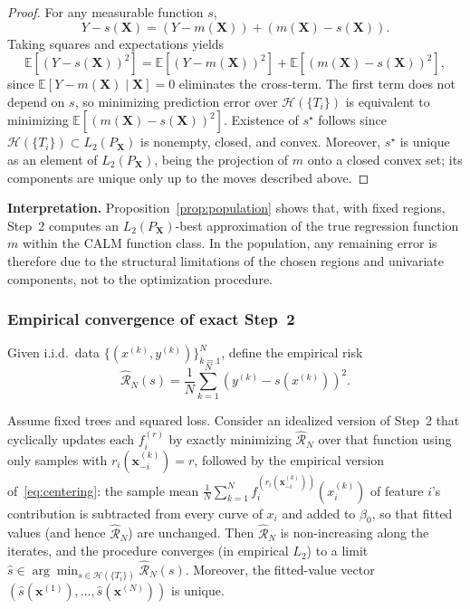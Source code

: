 \begin{proof}
For any measurable function $s$,
\[
Y-s(\mathbf{X})
=
(Y-m(\mathbf{X}))+(m(\mathbf{X})-s(\mathbf{X})).
\]
Taking squares and expectations yields
\[
\mathbb{E}[(Y-s(\mathbf{X}))^2]
=
\mathbb{E}[(Y-m(\mathbf{X}))^2]
+
\mathbb{E}[(m(\mathbf{X})-s(\mathbf{X}))^2],
\]
since $\mathbb{E}[Y-m(\mathbf{X})\mid \mathbf{X}]=0$ eliminates the cross-term.
The first term does not depend on $s$, so minimizing prediction error over
$\mathcal H(\{T_i\})$ is equivalent to minimizing
$\mathbb{E}[(m(\mathbf{X})-s(\mathbf{X}))^2]$.
Existence of $s^\star$ follows since $\mathcal H(\{T_i\})\subset L_2(P_{\mathbf{X}})$ is nonempty, closed, and convex.
Moreover, $s^\star$ is unique as an element of $L_2(P_{\mathbf{X}})$, being the projection of $m$ onto a closed convex set; its components are unique only up to the moves described above.
\end{proof}

\textbf{Interpretation.}
Proposition~\ref{prop:population} shows that, with fixed regions, Step~2 computes an $L_2(P_{\mathbf{X}})$-best approximation of the true regression function $m$ within the
CALM function class.
In the population, any remaining error is therefore due to the structural limitations of
the chosen regions and univariate components, not to the optimization procedure.

\subsubsection{Empirical convergence of exact Step~2}

Given i.i.d.\ data $\{(x^{(k)},y^{(k)})\}_{k=1}^N$, define the empirical risk
\[
\widehat{\mathcal R}_N(s)
=
\frac{1}{N}\sum_{k=1}^N (y^{(k)}-s(x^{(k)}))^2.
\]

\begin{proposition}
\label{prop:empirical}
Assume fixed trees and squared loss.
Consider an idealized version of Step~2 that cyclically updates each
$f_i^{(r)}$ by exactly minimizing $\widehat{\mathcal R}_N$ over that function
using only samples with $r_i(\mathbf{x}^{(k)}_{-i})=r$, followed by the empirical version of~\eqref{eq:centering}: the sample mean $\frac{1}{N}\sum_{k=1}^N f_i^{(r_i(\mathbf{x}^{(k)}_{-i}))}(x_i^{(k)})$ of feature $i$'s contribution is subtracted from every curve of $x_i$ and added to $\beta_0$, so that fitted values (and hence $\widehat{\mathcal R}_N$) are unchanged.
Then $\widehat{\mathcal R}_N$ is non-increasing along the iterates, and the
procedure converges (in empirical $L_2$) to a limit $\hat s\in\arg\min_{s\in\mathcal H(\{T_i\})}\widehat{\mathcal R}_N(s)$.
Moreover, the fitted-value vector $(\hat s(\mathbf{x}^{(1)}),\ldots,\hat s(\mathbf{x}^{(N)}))$ is unique.
\end{proposition}


